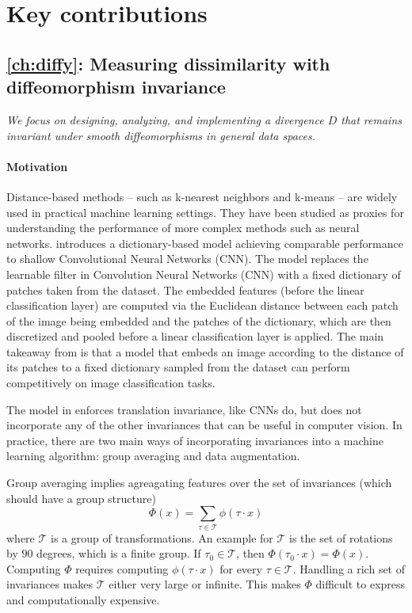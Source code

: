 \section{Key contributions}



\subsection*{\cref{ch:diffy}: Measuring dissimilarity with diffeomorphism invariance}

\emph{We focus on designing, analyzing, and implementing a divergence $D$ that remains invariant under smooth diffeomorphisms in general data spaces.}


\paragraph{Motivation}
Distance-based methods -- such as k-nearest neighbors and k-means -- are widely used in practical machine learning settings. They have been studied as proxies for understanding the performance of more complex methods such as neural networks. \cite{thiry} introduces a dictionary-based model achieving comparable performance to shallow Convolutional Neural Networks (CNN). The model replaces the learnable filter in Convolution Neural Networks (CNN) with a fixed dictionary of patches taken from the dataset. The embedded features (before the linear classification layer) are computed via the Euclidean distance between each patch of the image being embedded and the patches of the dictionary, which are then discretized and pooled before a linear classification layer is applied. The main takeaway from \cite{thiry} is that a model that embeds an image according to the distance of its patches to a fixed dictionary sampled from the dataset can perform competitively on image classification tasks.

The model in \cite{thiry} enforces translation invariance, like CNNs do, but does not incorporate any of the other invariances that can be useful in computer vision. In practice, there are two main ways of incorporating invariances into a machine learning algorithm: group averaging and data augmentation.

Group averaging implies agreagating features over the set of invariances (which should have a group structure)
\begin{equation}
    \Phi(x) = \sum_{\tau \in \mathcal T} \phi(\tau \cdot x)
\end{equation}
where $\mathcal T$ is a group of transformations. An example for $\mathcal T$ is the set of rotations by $90$ degrees, which is a finite group. If $\tau_0\in\mathcal T$, then $\Phi(\tau_0 \cdot x) = \Phi(x)$. Computing $\Phi$ requires computing $\phi(\tau \cdot x)$ for every $\tau\in\mathcal T$. Handling a rich set of invariances makes $\mathcal T$ either very large or infinite. This makes $\Phi$ difficult to express and computationally expensive.

